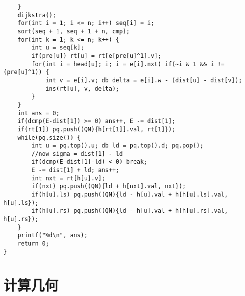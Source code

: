 \documentclass{article}
\begin{document}
\begin{lstlisting}
	}
	dijkstra();
	for(int i = 1; i <= n; i++) seq[i] = i;
	sort(seq + 1, seq + 1 + n, cmp);
	for(int k = 1; k <= n; k++) {
		int u = seq[k];
		if(pre[u]) rt[u] = rt[e[pre[u]^1].v];
		for(int i = head[u]; i; i = e[i].nxt) if(~i & 1 && i != (pre[u]^1)) {
			int v = e[i].v; db delta = e[i].w - (dist[u] - dist[v]);
			ins(rt[u], v, delta);
		}
	}
	int ans = 0;
	if(dcmp(E-dist[1]) >= 0) ans++, E -= dist[1];
	if(rt[1]) pq.push((QN){h[rt[1]].val, rt[1]});
	while(pq.size()) {
		int u = pq.top().u; db ld = pq.top().d; pq.pop();
		//now sigma = dist[1] - ld
		if(dcmp(E-dist[1]-ld) < 0) break;
		E -= dist[1] + ld; ans++;
		int nxt = rt[h[u].v];
		if(nxt) pq.push((QN){ld + h[nxt].val, nxt});
		if(h[u].ls) pq.push((QN){ld - h[u].val + h[h[u].ls].val, h[u].ls});
		if(h[u].rs) pq.push((QN){ld - h[u].val + h[h[u].rs].val, h[u].rs});
	}
	printf("%d\n", ans);
	return 0;
}
   \end{lstlisting}
   \section{计算几何}
\end{document}

